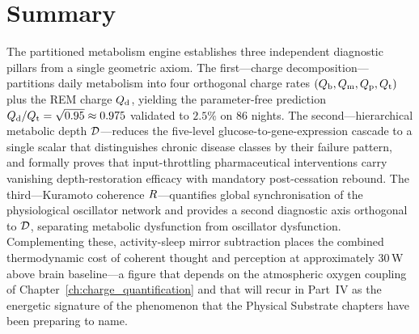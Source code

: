 \section*{Summary}

The partitioned metabolism engine establishes three independent diagnostic pillars from a single geometric axiom. The first---charge decomposition---partitions daily metabolism into four orthogonal charge rates $(Q_{\mathrm{b}}, Q_{\mathrm{m}}, Q_{\mathrm{p}}, Q_{\mathrm{t}})$ plus the REM charge $Q_{\mathrm{d}}$, yielding the parameter-free prediction $Q_{\mathrm{d}}/Q_{\mathrm{t}} = \sqrt{0.95} \approx 0.975$ validated to $2.5\%$ on 86 nights. The second---hierarchical metabolic depth $\mathcal{D}$---reduces the five-level glucose-to-gene-expression cascade to a single scalar that distinguishes chronic disease classes by their failure pattern, and formally proves that input-throttling pharmaceutical interventions carry vanishing depth-restoration efficacy with mandatory post-cessation rebound. The third---Kuramoto coherence $R$---quantifies global synchronisation of the physiological oscillator network and provides a second diagnostic axis orthogonal to $\mathcal{D}$, separating metabolic dysfunction from oscillator dysfunction. Complementing these, activity-sleep mirror subtraction places the combined thermodynamic cost of coherent thought and perception at approximately $30$\,W above brain baseline---a figure that depends on the atmospheric oxygen coupling of Chapter~\ref{ch:charge_quantification} and that will recur in Part~IV as the energetic signature of the phenomenon that the Physical Substrate chapters have been preparing to name.
